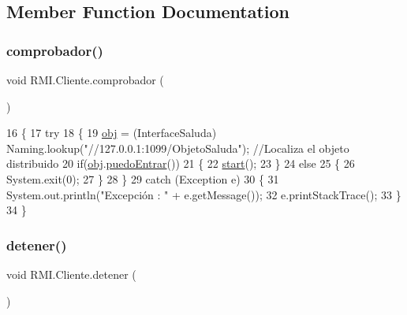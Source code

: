 \subsection{Member Function Documentation}
\mbox{\label{class_r_m_i_1_1_cliente_af1963dfc32e418055908fd85f49143e0}} 
\subsubsection{\texorpdfstring{comprobador()}{comprobador()}}
{\footnotesize\ttfamily void R\+M\+I.\+Cliente.\+comprobador (\begin{DoxyParamCaption}{ }\end{DoxyParamCaption})\hspace{0.3cm}{\ttfamily [inline]}}


\begin{DoxyCode}
16     \{
17         \textcolor{keywordflow}{try}
18         \{
19             \mbox{\hyperlink{class_r_m_i_1_1_cliente_ac0b62b87dd4c8edc00a335d7f029f8fa}{obj}} = (InterfaceSaluda) Naming.lookup(\textcolor{stringliteral}{"//127.0.0.1:1099/ObjetoSaluda"}); \textcolor{comment}{//Localiza el objeto
       distribuido}
20             \textcolor{keywordflow}{if}(\mbox{\hyperlink{class_r_m_i_1_1_cliente_ac0b62b87dd4c8edc00a335d7f029f8fa}{obj}}.\mbox{\hyperlink{interface_r_m_i_1_1_interface_saluda_afbc3db469b848c5a90bbf10ebc20823f}{puedoEntrar}}())
21             \{
22                 \mbox{\hyperlink{namespaceejemplo_1_1clase_abcf43191f0ecf3b071ca2db7696ba821}{start}}();
23             \}
24             \textcolor{keywordflow}{else}
25             \{
26                 System.exit(0);
27             \}
28         \}
29         \textcolor{keywordflow}{catch} (Exception e)
30         \{
31             System.out.println(\textcolor{stringliteral}{"Excepción : "} + e.getMessage());
32             e.printStackTrace();
33         \}
34     \}
\end{DoxyCode}
\mbox{\label{class_r_m_i_1_1_cliente_a5b7c4cee8614116c01643bf47de62e7a}} 
\subsubsection{\texorpdfstring{detener()}{detener()}}
{\footnotesize\ttfamily void R\+M\+I.\+Cliente.\+detener (\begin{DoxyParamCaption}{ }\end{DoxyParamCaption})\hspace{0.3cm}{\ttfamily [inline]}}


